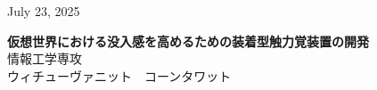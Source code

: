 \documentclass[uplatex,
12pt, %
a4paper,
english, %
oneside,
titlepage,
singlespacing, %
liststotoc, %
headsepline,
]{MastersDoctoralThesis} %
\begin{document}
\vspace{2cm} %
\begin{center}
      {July 23, 2025} %
\end{center}




\clearpage
\thispagestyle{empty}
\begin{center}
    \vspace*{1cm} %
    \begin{CJK*}{UTF8}{min}
      {\Large \textbf{仮想世界における没入感を高めるための装着型触力覚装置の開発}} \\ %
      \vspace{1.5cm} %
      {情報工学専攻} \\ %
      {ウィチューヴァニット　コーンタワット} \\ %
      {}
    \end{CJK*}
    \vspace*{2cm} %

\end{center}
\end{document}
